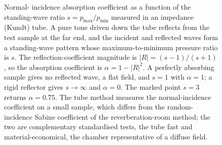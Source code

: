 \begin{figure}[htbp]
\centering
{}
\caption[Absorption coefficient from the standing-wave ratio]{Normal-
incidence absorption coefficient as a function of the standing-wave ratio
$s=p_{\max}/p_{\min}$ measured in an impedance (Kundt) tube. A pure tone
driven down the tube reflects from the test sample at the far end, and
the incident and reflected waves form a standing-wave pattern whose
maximum-to-minimum pressure ratio is $s$. The reflection-coefficient
magnitude is $|R|=(s-1)/(s+1)$, so the absorption coefficient is
$\alpha=1-|R|^2$. A perfectly absorbing sample gives no reflected wave,
a flat field, and $s=1$ with $\alpha=1$; a rigid reflector gives
$s\to\infty$ and $\alpha=0$. The marked point $s=3$ returns
$\alpha=0.75$. The tube method measures the normal-incidence coefficient
on a small sample, which differs from the random-incidence Sabine
coefficient of the reverberation-room method; the two are complementary
standardised tests, the tube fast and material-economical, the chamber
representative of a diffuse field.}
\label{fig:vol03ch07:impedance-tube}
\end{figure}
